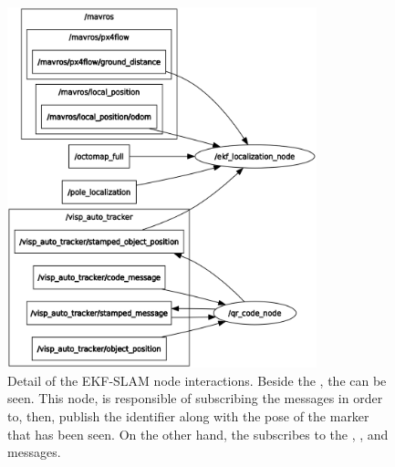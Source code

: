\begin{figure}[h]
    \centering
    \includegraphics[width=0.8\textwidth]{Images/fig12-rosgraph_ekf_node}
    \caption[Detail of the EKF-SLAM node interactions]{Detail of the EKF-SLAM node interactions. Beside the , the  can be seen. This node, is responsible of subscribing the  messages in order to, then, publish the identifier along with the pose of the marker that has been seen. On the other hand, the  subscribes to the , ,  and  messages.}
    \label{fig:chapter2:architecture:nodes:ekf_node}
\end{figure}




















